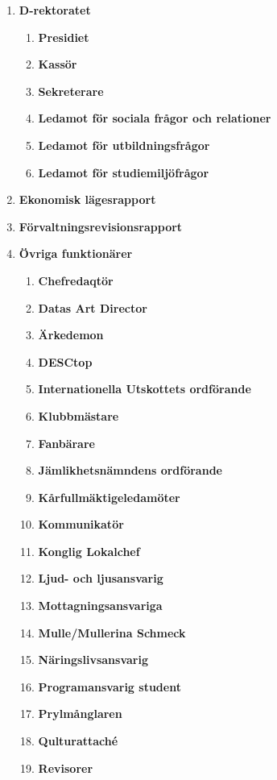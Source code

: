 \documentclass{protokoll}
\begin{document}
  \begin{enumerate}
    \item \textbf{D-rektoratet}
      \begin{enumerate}
        \item \textbf{Presidiet}
        \item \textbf{Kassör}
        \item \textbf{Sekreterare}
        \item \textbf{Ledamot för sociala frågor och relationer}
        \item \textbf{Ledamot för utbildningsfrågor}
        \item \textbf{Ledamot för studiemiljöfrågor}
      \end{enumerate}
    \item \textbf{Ekonomisk lägesrapport}
    \item \textbf{Förvaltningsrevisionsrapport}
    \item \textbf{Övriga funktionärer}
      \begin{enumerate}
      	\item \textbf{Chefredaqtör}
      	\item \textbf{Datas Art Director}
        \item \textbf{Ärkedemon}
        \item \textbf{DESCtop}
        \item \textbf{Internationella Utskottets ordförande}
        \item \textbf{Klubbmästare}
        \item \textbf{Fanbärare}
        \item \textbf{Jämlikhetsnämndens ordförande}
        \item \textbf{Kårfullmäktigeledamöter}
        \item \textbf{Kommunikatör}
        \item \textbf{Konglig Lokalchef}
        \item \textbf{Ljud- och ljusansvarig}
        \item \textbf{Mottagningsansvariga}
        \item \textbf{Mulle/Mullerina Schmeck}
        \item \textbf{Näringslivsansvarig}
        \item \textbf{Programansvarig student}
        \item \textbf{Prylmånglaren}
        \item \textbf{Qulturattaché}
        \item \textbf{Revisorer}

\end{enumerate}
\end{enumerate}
\end{document}
